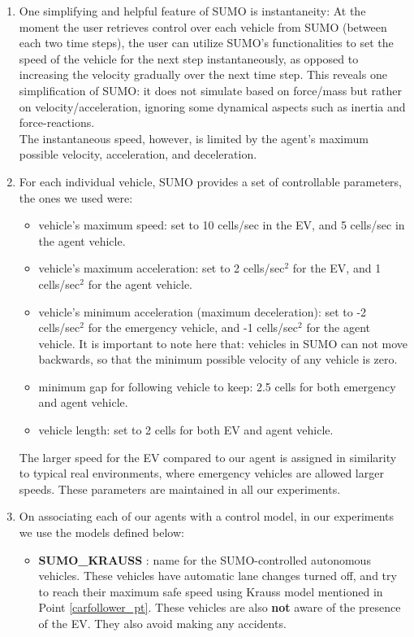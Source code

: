 \begin{itemize}
\begin{enumerate}
    \item One simplifying and helpful feature of SUMO is instantaneity: At the moment the user retrieves control over each vehicle from SUMO (between each two time steps), the user can utilize SUMO's functionalities to set the speed of the vehicle for the next step instantaneously, as opposed to increasing the velocity gradually over the next time step. This reveals one simplification of SUMO: it does not simulate based on force/mass but rather on velocity/acceleration, ignoring some dynamical aspects such as inertia and force-reactions.\\
    The instantaneous speed, however, is limited by the agent's maximum possible velocity, acceleration, and deceleration.
    \label{instantaneity_pt}
    
    \item For each individual vehicle, SUMO provides a set of controllable parameters, the ones we used were:
    \begin{itemize}
        \item vehicle's maximum speed: set to 10 cells/sec in the EV, and 5 cells/sec in the agent vehicle.
        
        \item  vehicle's maximum acceleration: set to 2 cells/sec$^2$ for the EV, and 1 cells/sec$^2$ for the agent vehicle.
        
        \item vehicle's minimum acceleration (maximum deceleration): set to -2 cells/sec$^2$ for the emergency vehicle, and -1 cells/sec$^2$ for the agent vehicle. It is important to note here that: vehicles in SUMO can not move backwards, so that the minimum possible velocity of any vehicle is zero.
        
        \item minimum gap for following vehicle to keep: 2.5 cells for both emergency and agent vehicle.
        
        \item vehicle length: set to 2 cells for both EV and agent vehicle.
    \end{itemize}
    The larger speed for the EV compared to our agent is assigned in similarity to typical real environments, where emergency vehicles are allowed larger speeds. These parameters are maintained in all our experiments.
    
    
    \item On associating each of our agents with a control model, in our experiments we use the models defined below:
    \begin{itemize}
        \item \textbf{SUMO\_KRAUSS }: name for the SUMO-controlled autonomous vehicles. These vehicles have automatic lane changes turned off, and try to reach their maximum safe speed using Krauss model mentioned in Point \ref{carfollower_pt}. These vehicles are also \textbf{not} aware of the presence of the EV. They also avoid making any accidents.
        

\end{itemize}
\end{enumerate}
\end{itemize}
